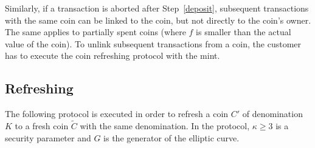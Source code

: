 \documentclass{llncs}
\begin{document}
Similarly, if a transaction is aborted after Step~\ref{deposit},
subsequent transactions with the same coin can be linked to the coin,
but not directly to the coin's owner.  The same applies to partially
spent coins (where $f$ is smaller than the actual value of the coin).
To unlink subsequent transactions from a coin, the customer has to
execute the coin refreshing protocol with the mint.

%
%
%


\subsection{Refreshing}

The following protocol is executed in order to refresh a coin $C'$ of
denomination $K$ to a fresh coin $\widetilde{C}$ with the same
denomination. In the protocol, $\kappa \ge 3$ is a security parameter
and $G$ is the generator of the elliptic curve.
\end{document}
